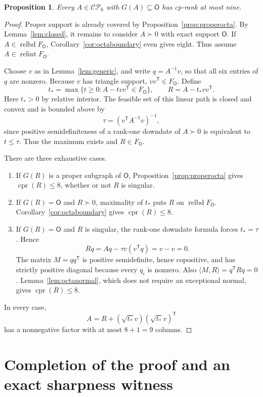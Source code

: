 \documentclass[11pt,a4paper]{article}
\newtheorem{proposition}[theorem]{Proposition}
\theoremstyle{definition}
\newcommand{\CP}{\mathcal{CP}}
\newcommand{\OO}{\mathsf{O}}
\DeclareMathOperator{\cpr}{cpr}
\DeclareMathOperator{\relint}{relint}
\DeclareMathOperator{\relbd}{relbd}
\newcommand{\ip}[2]{\langle #1,#2\rangle}
\newcommand{\T}{\mathsf T}
\begin{document}
\begin{proposition}\label{prop:octa9}
Every $A\in\CP_6$ with $G(A)\subseteq\OO$ has cp-rank at most nine.
\end{proposition}
\begin{proof}
Proper support is already covered by Proposition~\ref{prop:properocta}. By Lemma~\ref{lem:closed}, it remains to consider $A\succ0$ with exact support $\OO$. If $A\in\relbd F_{\OO}$, Corollary~\ref{cor:octaboundary} even gives eight. Thus assume $A\in\relint F_{\OO}$.

Choose $v$ as in Lemma~\ref{lem:generic}, and write $q=A^{-1}v$, so that all six entries of $q$ are nonzero. Because $v$ has triangle support, $vv^{\T}\in F_{\OO}$. Define
\[
 t_* =\max\{t\geq0:A-tvv^{\T}\in F_{\OO}\},
 \qquad R=A-t_*vv^{\T}.
\]
Here $t_*>0$ by relative interior. The feasible set of this linear path is closed and convex and is bounded above by
\begin{equation}\label{eq:psdendpoint}
 \tau=(v^{\T}A^{-1}v)^{-1},
\end{equation}
since positive semidefiniteness of a rank-one downdate of $A\succ0$ is equivalent to $t\leq\tau$. Thus the maximum exists and $R\in F_{\OO}$.

There are three exhaustive cases.
\begin{enumerate}[label=\textnormal{(\roman*)}]
\item If $G(R)$ is a proper subgraph of $\OO$, Proposition~\ref{prop:properocta} gives $\cpr(R)\leq8$, whether or not $R$ is singular.
\item If $G(R)=\OO$ and $R\succ0$, maximality of $t_*$ puts $R$ on $\relbd F_{\OO}$. Corollary~\ref{cor:octaboundary} gives $\cpr(R)\leq8$.
\item If $G(R)=\OO$ and $R$ is singular, the rank-one downdate formula forces $t_*=\tau$. Hence
\[
 Rq=Aq-\tau v(v^{\T}q)=v-v=0.
\]
The matrix $M=qq^{\T}$ is positive semidefinite, hence copositive, and has strictly positive diagonal because every $q_i$ is nonzero. Also $\ip{M}{R}=q^{\T}Rq=0$. Lemma~\ref{lem:octanormal}, which does not require an exceptional normal, gives $\cpr(R)\leq8$.
\end{enumerate}
In every case,
\[
 A=R+(\sqrt{t_*}v)(\sqrt{t_*}v)^{\T}
\]
has a nonnegative factor with at most $8+1=9$ columns.
\end{proof}

\section{Completion of the proof and an exact sharpness witness}
\end{document}
